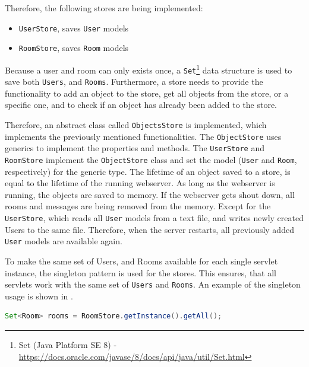 Therefore, the following stores are being implemented:
\begin{itemize}
\item \texttt{UserStore}, saves \texttt{User} models
\item \texttt{RoomStore}, saves \texttt{Room} models
\end{itemize}
Because a user and room can only exists once, a \texttt{Set}\footnote{Set (Java Platform SE 8) - \url{https://docs.oracle.com/javase/8/docs/api/java/util/Set.html}} data structure is used to save both \texttt{Users}, and \texttt{Rooms}. Furthermore, a store needs to provide the functionality to add an object to the store, get all objects from the store, or a specific one, and to check if an object has already been added to the store.


Therefore, an abstract class called \texttt{ObjectsStore} is implemented, which implements the previously mentioned functionalities.
The \texttt{ObjectStore} uses generics to implement the properties and methods. The \texttt{UserStore} and \texttt{RoomStore} implement the \texttt{ObjectStore} class and set the model (\texttt{User} and \texttt{Room}, respectively) for the generic type.
The lifetime of an object saved to a store, is equal to the lifetime of the running webserver. As long as the webserver is running, the objects are saved to memory. If the webserver gets shout down, all rooms and messages are being removed from the memory.
Except for the \texttt{UserStore}, which reads all \texttt{User} models from a text file, and writes newly created Users to the same file. Therefore, when the server restarts, all previously added \texttt{User} models are available again.

To make the same set of Users, and Rooms available for each single servlet instance, the singleton pattern is used for the stores. This ensures, that all servlets work with the same set of \texttt{Users} and \texttt{Rooms}. An example of the singleton usage is shown in .
\begin{lstlisting}[label=lst:03_impl_objstores_singleton, caption=Example usage of the singleton pattern, language=java]
Set<Room> rooms = RoomStore.getInstance().getAll();
\end{lstlisting}


